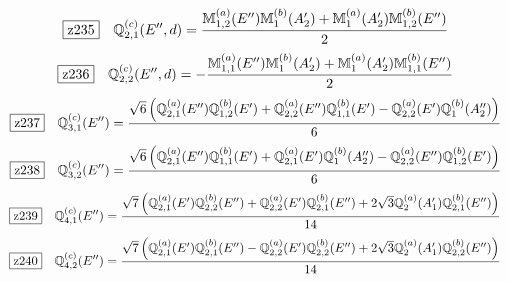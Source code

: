 \documentclass[fleqn,10pt,landscape]{jsarticle}
\begin{document}
\begin{dmath*}
\hspace*{3mm}\fbox{z235}\quad \mathbb{Q}_{2,1}^{(c)}(E^{\prime\prime},d)=\frac{\mathbb{M}_{1,2}^{(a)}(E^{\prime\prime}) \mathbb{M}_{1}^{(b)}(A_{2}^{\prime}) + \mathbb{M}_{1}^{(a)}(A_{2}^{\prime}) \mathbb{M}_{1,2}^{(b)}(E^{\prime\prime})}{2}
\end{dmath*}
\begin{dmath*}
\hspace*{3mm}\fbox{z236}\quad \mathbb{Q}_{2,2}^{(c)}(E^{\prime\prime},d)=- \frac{\mathbb{M}_{1,1}^{(a)}(E^{\prime\prime}) \mathbb{M}_{1}^{(b)}(A_{2}^{\prime}) + \mathbb{M}_{1}^{(a)}(A_{2}^{\prime}) \mathbb{M}_{1,1}^{(b)}(E^{\prime\prime})}{2}
\end{dmath*}
\begin{dmath*}
\hspace*{3mm}\fbox{z237}\quad \mathbb{Q}_{3,1}^{(c)}(E^{\prime\prime})=\frac{\sqrt{6} \left(\mathbb{Q}_{2,1}^{(a)}(E^{\prime\prime}) \mathbb{Q}_{1,2}^{(b)}(E^{\prime}) + \mathbb{Q}_{2,2}^{(a)}(E^{\prime\prime}) \mathbb{Q}_{1,1}^{(b)}(E^{\prime}) - \mathbb{Q}_{2,2}^{(a)}(E^{\prime}) \mathbb{Q}_{1}^{(b)}(A_{2}^{\prime\prime})\right)}{6}
\end{dmath*}
\begin{dmath*}
\hspace*{3mm}\fbox{z238}\quad \mathbb{Q}_{3,2}^{(c)}(E^{\prime\prime})=\frac{\sqrt{6} \left(\mathbb{Q}_{2,1}^{(a)}(E^{\prime\prime}) \mathbb{Q}_{1,1}^{(b)}(E^{\prime}) + \mathbb{Q}_{2,1}^{(a)}(E^{\prime}) \mathbb{Q}_{1}^{(b)}(A_{2}^{\prime\prime}) - \mathbb{Q}_{2,2}^{(a)}(E^{\prime\prime}) \mathbb{Q}_{1,2}^{(b)}(E^{\prime})\right)}{6}
\end{dmath*}
\begin{dmath*}
\hspace*{3mm}\fbox{z239}\quad \mathbb{Q}_{4,1}^{(c)}(E^{\prime\prime})=\frac{\sqrt{7} \left(\mathbb{Q}_{2,1}^{(a)}(E^{\prime}) \mathbb{Q}_{2,2}^{(b)}(E^{\prime\prime}) + \mathbb{Q}_{2,2}^{(a)}(E^{\prime}) \mathbb{Q}_{2,1}^{(b)}(E^{\prime\prime}) + 2 \sqrt{3} \mathbb{Q}_{2}^{(a)}(A_{1}^{\prime}) \mathbb{Q}_{2,1}^{(b)}(E^{\prime\prime})\right)}{14}
\end{dmath*}
\begin{dmath*}
\hspace*{3mm}\fbox{z240}\quad \mathbb{Q}_{4,2}^{(c)}(E^{\prime\prime})=\frac{\sqrt{7} \left(\mathbb{Q}_{2,1}^{(a)}(E^{\prime}) \mathbb{Q}_{2,1}^{(b)}(E^{\prime\prime}) - \mathbb{Q}_{2,2}^{(a)}(E^{\prime}) \mathbb{Q}_{2,2}^{(b)}(E^{\prime\prime}) + 2 \sqrt{3} \mathbb{Q}_{2}^{(a)}(A_{1}^{\prime}) \mathbb{Q}_{2,2}^{(b)}(E^{\prime\prime})\right)}{14}
\end{dmath*}
\end{document}
